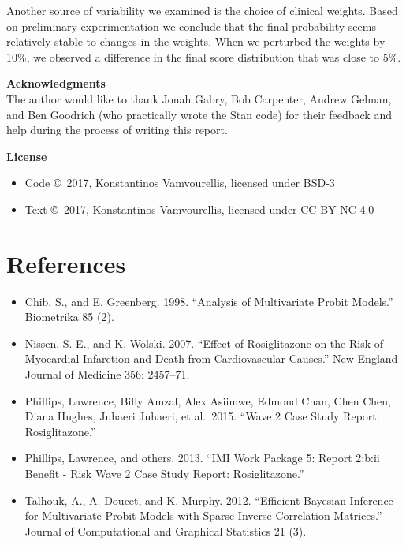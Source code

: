 \documentclass[11pt]{article}
\providecommand{\tightlist}{%
      \setlength{\itemsep}{0pt}\setlength{\parskip}{0pt}}
\begin{document}
Another source of variability we examined is the choice of clinical
weights. Based on preliminary experimentation we conclude that the final
probability seems relatively stable to changes in the weights. When we
perturbed the weights by 10\%, we observed a difference in the final
score distribution that was close to 5\%.

\textbf{Acknowledgments}\\
The author would like to thank Jonah Gabry, Bob Carpenter, Andrew
Gelman, and Ben Goodrich (who practically wrote the Stan code) for their
feedback and help during the process of writing this report.

\textbf{License}

\begin{itemize}
\tightlist
\item
  Code \copyright~2017, Konstantinos Vamvourellis, licensed under BSD-3\\
\item
  Text \copyright~2017, Konstantinos Vamvourellis, licensed under CC BY-NC 4.0
\end{itemize}

    \hypertarget{references}{%
\section{References}\label{references}}

\begin{itemize}
\item
  Chib, S., and E. Greenberg. 1998. ``Analysis of Multivariate Probit
  Models.'' Biometrika 85 (2).
\item
  Nissen, S. E., and K. Wolski. 2007. ``Effect of Rosiglitazone on the
  Risk of Myocardial Infarction and Death from Cardiovascular Causes.''
  New England Journal of Medicine 356: 2457--71.
\item
  Phillips, Lawrence, Billy Amzal, Alex Asiimwe, Edmond Chan, Chen Chen,
  Diana Hughes, Juhaeri Juhaeri, et al.~2015. ``Wave 2 Case Study
  Report: Rosiglitazone.''
\item
  Phillips, Lawrence, and others. 2013. ``IMI Work Package 5: Report
  2:b:ii Benefit - Risk Wave 2 Case Study Report: Rosiglitazone.''
\item
  Talhouk, A., A. Doucet, and K. Murphy. 2012. ``Efficient Bayesian
  Inference for Multivariate Probit Models with Sparse Inverse
  Correlation Matrices.'' Journal of Computational and Graphical
  Statistics 21 (3).
\end{itemize}


    
    
    
    
\end{document}
